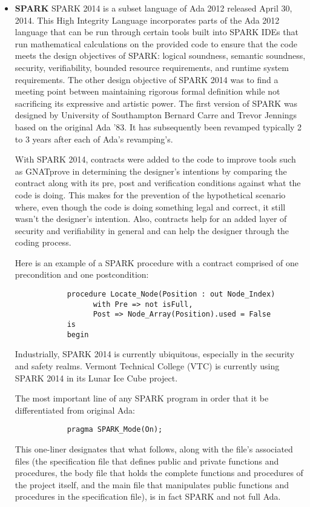 \begin{itemize}
\item \textbf{SPARK} SPARK 2014 is a subset language of Ada 2012 released April 30, 2014. This
  High Integrity Language incorporates parts of the Ada 2012 language that can be run through
  certain tools built into SPARK IDEs that run mathematical calculations on the provided code to
  ensure that the code meets the design objectives of SPARK: logical soundness, semantic
  soundness, security, verifiability, bounded resource requirements, and runtime system
  requirements. The other design objective of SPARK 2014 was to find a meeting point between
  maintaining rigorous formal definition while not sacrificing its expressive and artistic
  power. The first version of SPARK was designed by University of Southampton Bernard Carre and
  Trevor Jennings based on the original Ada ’83. It has subsequently been revamped typically 2
  to 3 years after each of Ada’s revamping’s.

  With SPARK 2014, contracts were added to the code to improve tools such as GNATprove in
  determining the designer’s intentions by comparing the contract along with its pre, post and
  verification conditions against what the code is doing. This makes for the prevention of the
  hypothetical scenario where, even though the code is doing something legal and correct, it
  still wasn’t the designer’s intention. Also, contracts help for an added layer of security and
  verifiability in general and can help the designer through the coding process.

  Here is an example of a SPARK procedure with a contract comprised of one precondition and one
  postcondition:
\begin{verbatim}
			procedure Locate_Node(Position : out Node_Index)
    		   	  with Pre => not isFull,
    		   	  Post => Node_Array(Position).used = False
   		 	is
   		 	begin
\end{verbatim}
  
  Industrially, SPARK 2014 is currently ubiquitous, especially in the security and safety
  realms. Vermont Technical College (VTC) is currently using SPARK 2014 in its Lunar Ice Cube
  project.

  The most important line of any SPARK program in order that it be differentiated from original
  Ada:
\begin{verbatim}
			pragma SPARK_Mode(On);
\end{verbatim}			

  This one-liner designates that what follows, along with the file’s associated files (the
  specification file that defines public and private functions and procedures, the body file
  that holds the complete functions and procedures of the project itself, and the main file that
  manipulates public functions and procedures in the specification file), is in fact SPARK and
  not full Ada.


\end{itemize}
